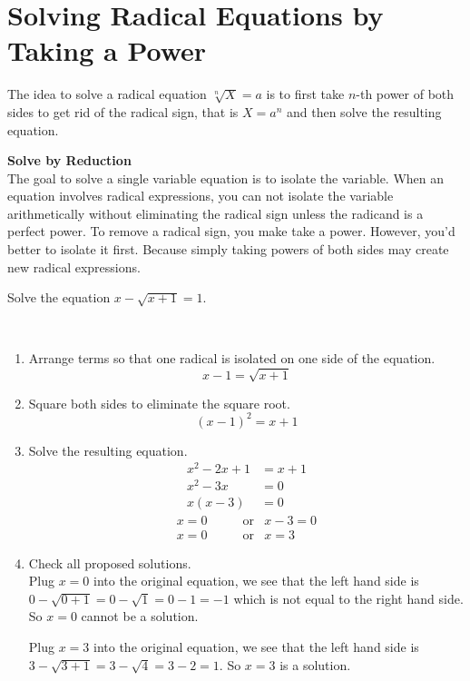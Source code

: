\documentclass[en,12pt]{elegantbook}
\let\BeginKnitrBlock\begin \let\EndKnitrBlock\end
\begin{document}
\hypertarget{solving-radical-equations-by-taking-a-power}{%
\section{Solving Radical Equations by Taking a Power}\label{solving-radical-equations-by-taking-a-power}}

The idea to solve a radical equation \(\sqrt[n]{X}=a\) is to first take \(n\)-th power of both sides to get rid of the radical sign, that is \(X=a^n\) and then solve the resulting equation.

\BeginKnitrBlock{rmdtip}
\textbf{Solve by Reduction}\\
The goal to solve a single variable equation is to isolate the variable. When an equation involves radical expressions, you can not isolate the variable arithmetically without eliminating the radical sign unless the radicand is a perfect power. To remove a radical sign, you make take a power. However, you'd better to isolate it first. Because simply taking powers of both sides may create new radical expressions.
\EndKnitrBlock{rmdtip}

\BeginKnitrBlock{example}
\protect\hypertarget{exm:unnamed-chunk-180}{}{\label{exm:unnamed-chunk-180} }
Solve the equation \(x-\sqrt{x+1}=1.\)
\EndKnitrBlock{example}

\BeginKnitrBlock{solution}
{}\\

\begin{enumerate}
\def\labelenumi{\arabic{enumi}.}
\item
  Arrange terms so that one radical is isolated on one side of the equation.
  \[x-1=\sqrt{x+1}\]
\item
  Square both sides to eliminate the square root.
  \[(x-1)^2=x+1\]
\item
  Solve the resulting equation.
  \[
     \begin{aligned}
         x^2-2x+1&=x+1\\
         x^2-3x&=0\\
         x(x-3)&=0
     \end{aligned}
  \]
  \[
  \begin{aligned}
     x =0 & \qquad \text{or} & x-3 =0 \\
     x =0 & \qquad \text{or} & x   =3
  \end{aligned}
  \]
\item
  Check all proposed solutions.\\
  Plug \(x=0\) into the original equation, we see that the left hand side is \(0-\sqrt{0+1}=0-\sqrt{1}=0-1=-1\) which is not equal to the right hand side. So \(x=0\) cannot be a solution.

  Plug \(x=3\) into the original equation, we see that the left hand side is \(3-\sqrt{3+1}=3-\sqrt{4}=3-2=1\). So \(x=3\) is a solution.
\end{enumerate}
\EndKnitrBlock{solution}
\end{document}
